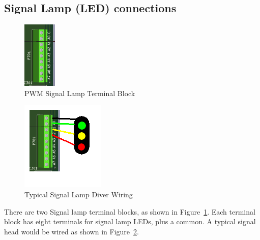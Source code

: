 \subsection{Signal Lamp (LED) connections}
\begin{figure}[hbpt]\begin{centering}%
\includegraphics{ESP32-S3-MultiFunction-PWMSignalLampTerminalBlocks.png}
\caption{PWM Signal Lamp Terminal Block}
\label{fig:ESP32-S3-MultiFunction-PWMSignalLampTerminalBlocks}
\end{centering}\end{figure}
\begin{figure}[hbpt]\begin{centering}%
\includegraphics{ESP32-S3-MultiFunction-PWMSignalLampWiring.png}
\caption{Typical Signal Lamp Diver Wiring}
\label{fig:ESP32-S3-MultiFunction-PWMSignalLampWiring}
\end{centering}\end{figure}

There are two Signal lamp terminal blocks, as shown in 
Figure~\ref{fig:ESP32-S3-MultiFunction-PWMSignalLampTerminalBlocks}. Each 
terminal block has eight terminals for signal lamp LEDs, plus a common.  A 
typical signal head would be wired as shown in 
Figure~\ref{fig:ESP32-S3-MultiFunction-PWMSignalLampWiring}.

